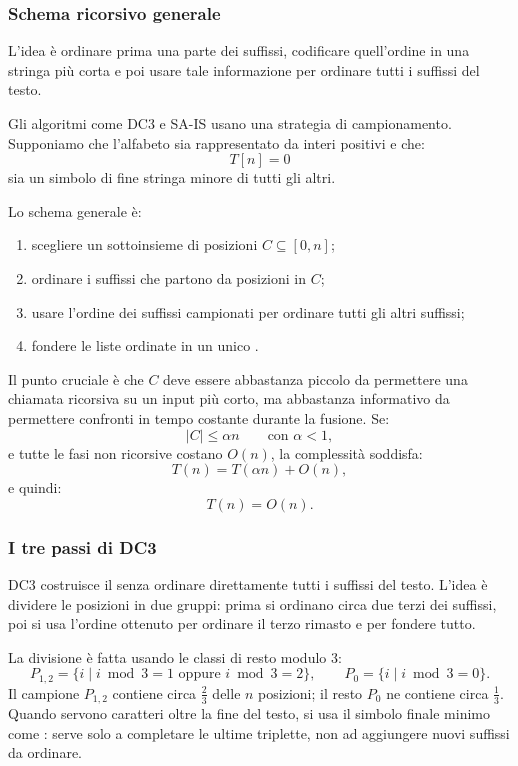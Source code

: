 \documentclass{article}
\theoremstyle{definition}
\numberwithin{equation}{section}
\begin{document}
\subsubsection{Schema ricorsivo generale}
L'idea è ordinare prima una parte dei suffissi, codificare quell'ordine in una stringa più corta e poi usare tale informazione per ordinare tutti i suffissi del testo.

Gli algoritmi come DC3 e SA-IS usano una strategia di campionamento. Supponiamo che l'alfabeto sia rappresentato da interi positivi e che:
\[
    T[n]=0
\]
sia un simbolo di fine stringa minore di tutti gli altri.

Lo schema generale è:
\begin{enumerate}
    \item scegliere un sottoinsieme di posizioni $C\subseteq [0,n]$;
    \item ordinare i suffissi che partono da posizioni in $C$;
    \item usare l'ordine dei suffissi campionati per ordinare tutti gli altri suffissi;
    \item fondere le liste ordinate in un unico .
\end{enumerate}

Il punto cruciale è che $C$ deve essere abbastanza piccolo da permettere una chiamata ricorsiva su un input più corto, ma abbastanza informativo da permettere confronti in tempo costante durante la fusione. Se:
\[
    |C|\leq \alpha n
    \qquad
    \text{con } \alpha<1,
\]
e tutte le fasi non ricorsive costano $O(n)$, la complessità soddisfa:
\begin{equation}\label{eq:recursive_sa_recurrence}
    T(n)=T(\alpha n)+O(n),
\end{equation}
e quindi:
\[
    T(n)=O(n).
\]

\subsubsection{I tre passi di DC3}
DC3 costruisce il  senza ordinare direttamente tutti i suffissi del testo. L'idea è dividere le posizioni in due gruppi: prima si ordinano circa due terzi dei suffissi, poi si usa l'ordine ottenuto per ordinare il terzo rimasto e per fondere tutto.

La divisione è fatta usando le classi di resto modulo $3$:
\[
    P_{1,2}=\{i\mid i\bmod 3=1 \text{ oppure } i\bmod 3=2\},
    \qquad
    P_0=\{i\mid i\bmod 3=0\}.
\]
Il campione $P_{1,2}$ contiene circa $\frac{2}{3}$ delle $n$ posizioni; il resto $P_0$ ne contiene circa $\frac{1}{3}$. Quando servono caratteri oltre la fine del testo, si usa il simbolo finale minimo come : serve solo a completare le ultime triplette, non ad aggiungere nuovi suffissi da ordinare.
\end{document}
